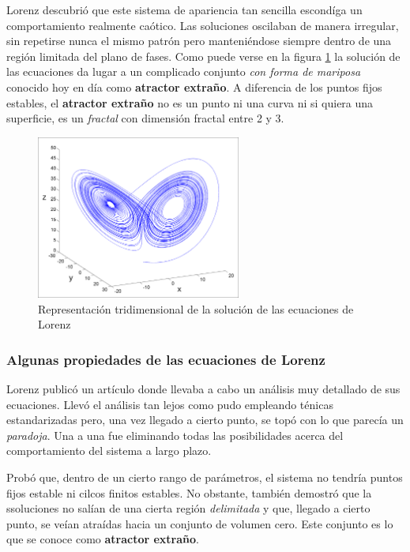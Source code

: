 Lorenz descubrió que este sistema de apariencia tan sencilla escondíga un comportamiento realmente caótico. Las soluciones oscilaban de manera irregular, sin repetirse nunca el mismo patrón pero manteniéndose siempre dentro de una región limitada del plano de fases. Como puede verse en la figura \ref{fig:Lorenz} la solución de las ecuaciones da lugar a un complicado conjunto \emph{con forma de mariposa} conocido hoy en día como \textbf{atractor extraño}. A diferencia de los puntos fijos estables, el \textbf{atractor extraño} no es un punto ni una curva ni si quiera una superficie, es un \emph{fractal} con dimensión fractal entre 2 y 3.

\begin{figure}[hbtp]
\centering
\includegraphics[width = 0.6\textwidth]{img/Lorenz.png}
\caption{Representación tridimensional de la solución de las ecuaciones de Lorenz}
\label{fig:Lorenz}
\end{figure}

\subsubsection{Algunas propiedades de las ecuaciones de Lorenz}
Lorenz publicó un artículo donde llevaba a cabo un análisis muy detallado de sus ecuaciones. Llevó el análisis tan lejos como pudo empleando ténicas estandarizadas pero, una vez llegado a cierto punto, se topó con lo que parecía un \emph{paradoja}. Una a una fue eliminando todas las posibilidades acerca del comportamiento del sistema a largo plazo.

Probó que, dentro de un cierto rango de parámetros, el sistema no tendría puntos fijos estable ni cilcos finitos estables. No obstante, también demostró que la ssoluciones no salían de una cierta región \emph{delimitada} y que, llegado a cierto punto, se veían atraídas hacia un conjunto de volumen cero. Este conjunto es lo que se conoce como \textbf{atractor extraño}.

